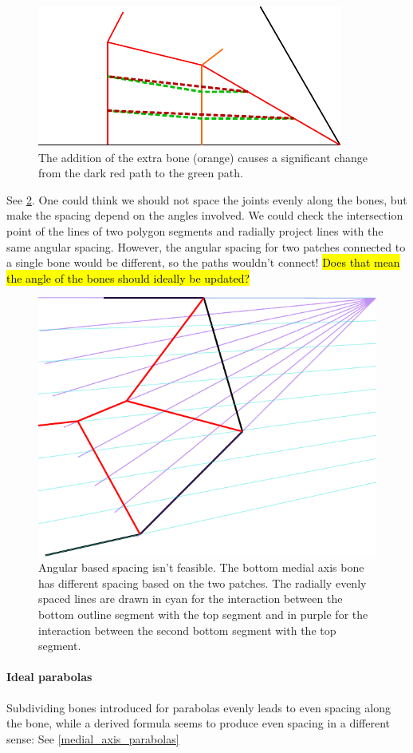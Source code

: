 \begin{figure}[H]
\centering
\includegraphics[width=.5\columnwidth]{sources/method/quad_instability.pdf}
\caption{The addition of the extra bone (orange) causes a significant change from the dark red path to the green path.}
\label{quad_instability}
\end{figure}



See \cref{angular_based_spacing}.
One could think we should not space the joints evenly along the bones, but make the spacing depend on the angles involved.
We could check the intersection point of the lines of two polygon segments and radially project lines with the same angular spacing.
However, the angular spacing for two patches connected to a single bone would be different, so the paths wouldn't connect!
\hl{Does that mean the angle of the bones should ideally be updated?}


\begin{figure}
\centering
\includegraphics[width=.5\columnwidth]{sources/method/angular_based_spacing.pdf}
\caption{Angular based spacing isn't feasible. The bottom medial axis bone has different spacing based on the two patches. The radially evenly spaced lines are drawn in cyan for the interaction between the bottom outline segment with the top segment and in purple for the interaction between the second bottom segment with  the top segment.}
\label{angular_based_spacing}
\end{figure}


\paragraph{Ideal parabolas}
Subdividing bones introduced for parabolas evenly leads to even spacing along the bone,
while a derived formula seems to produce even spacing in a different sense:
See \cref{medial_axis_parabolas}

